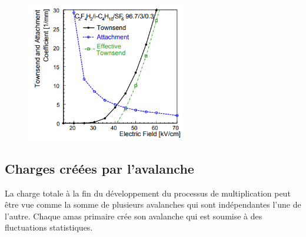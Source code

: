 \begin{figure}[ht!]
	\centering
	\includegraphics[width=0.62\textwidth]{RPC/tow.png}
	\label{tow}
\end{figure}

\subsection{Charges créées par l'avalanche}
La charge totale à la fin du développement du processus de multiplication peut être vue comme la somme de plusieurs avalanches qui sont indépendantes l'une de l'autre. Chaque amas primaire crée son avalanche qui est soumise à des fluctuations statistiques.

